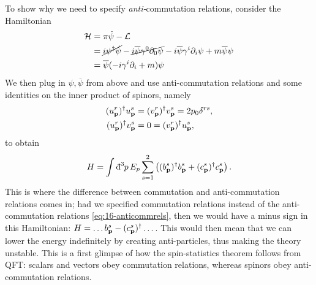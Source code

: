 To show why we need to specify \emph{anti-}commutation relations, consider the Hamiltonian
\begin{align}
  \mathcal{H} &= \pi \dot{\psi} - \mathcal{L} \\
 &= \cancel{i \psi^{\dagger} \dot{\psi}} - \cancel{i \overline{\psi} \gamma^0 \partial_0 \psi} - i \overline{\psi} \gamma^{i} \partial_{i} \psi + m \overline{\psi} \psi \\
 &= \overline{\psi} (-i \gamma^{i} \partial_{i} + m) \psi
\end{align}
We then plug in $\psi, \overline{\psi}$ from above and use anti-commutation relations and some identities on the inner product of spinors, namely
\begin{subequations}
  \begin{align}
    (u_{\vb{p}}^{r})^{\dagger} u_{\vb{p}}^{s} &= (v_{\vb{p}}^{r})^{\dagger} v_{\vb{p}}^{s} = 2 p_0 \delta^{rs}, \\
    (u_{\vb{p}}^{r})^{\dagger} v_{\vb{p}}^{s} &= 0 = (v_{\vb{p}}^{r})^{\dagger} u_{\vb{p}}^{s},
  \end{align}
\end{subequations}
to obtain
\begin{equation}
  H = \int \bdd[3]{p} E_p \sum_{s=1}^{2} \left( (b_{\vb{p}}^{s})^{\dagger} b^{s}_{\vb{p}} + (c_{\vb{p}}^{s})^{\dagger} c^{s}_{\vb{p}} \right).
\end{equation}
This is where the difference between commutation and anti-commutation relations comes in; had we specified commutation relations instead of the anti-commutation relations \eqref{eq:16-anticommrels}, then we would have a minus sign in this Hamiltonian: $H= \dots b_{\vb{p}}^{s} - (c_{\vb{p}}^{s})^{\dagger} \dots$.
This would then mean that we can lower the energy indefinitely by creating anti-particles, thus making the theory unstable.
This is a first glimpse of how the spin-statistics theorem follows from QFT: scalars and vectors obey commutation relations, whereas spinors obey anti-commutation relations.
